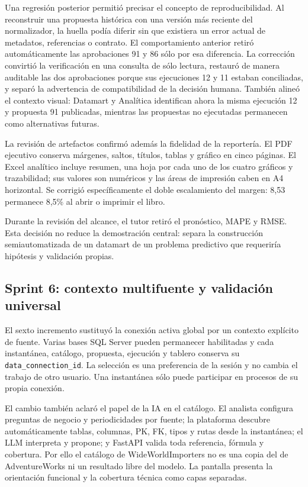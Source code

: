 \documentclass[11pt,letterpaper]{article}
\newcommand{\file}[1]{\texttt{#1}}
\begin{document}
Una regresión posterior permitió precisar el concepto de reproducibilidad. Al reconstruir una
propuesta histórica con una versión más reciente del normalizador, la huella podía diferir
sin que existiera un error actual de metadatos, referencias o contrato. El comportamiento
anterior retiró automáticamente las aprobaciones 91 y 86 sólo por esa diferencia. La
corrección convirtió la verificación en una consulta de sólo lectura, restauró de manera
auditable las dos aprobaciones porque sus ejecuciones 12 y 11 estaban conciliadas, y separó
la advertencia de compatibilidad de la decisión humana. También alineó el contexto visual:
Datamart y Analítica identifican ahora la misma ejecución 12 y propuesta 91 publicadas,
mientras las propuestas no ejecutadas permanecen como alternativas futuras.

La revisión de artefactos confirmó además la fidelidad de la reportería. El PDF ejecutivo conserva márgenes, saltos, títulos, tablas y gráfico en cinco páginas. El Excel analítico incluye resumen, una hoja por cada uno de los cuatro gráficos y trazabilidad; sus valores son numéricos y las áreas de impresión caben en A4 horizontal. Se corrigió específicamente el doble escalamiento del margen: 8,53 permanece 8,5\% al abrir o imprimir el libro.

Durante la revisión del alcance, el tutor retiró el pronóstico, MAPE y RMSE. Esta decisión no reduce la demostración central: separa la construcción semiautomatizada de un datamart de un problema predictivo que requeriría hipótesis y validación propias.

\subsection{Sprint 6: contexto multifuente y validación universal}

El sexto incremento sustituyó la conexión activa global por un contexto explícito de fuente. Varias bases SQL Server pueden permanecer habilitadas y cada instantánea, catálogo, propuesta, ejecución y tablero conserva su \file{data\_connection\_id}. La selección es una preferencia de la sesión y no cambia el trabajo de otro usuario. Una instantánea sólo puede participar en procesos de su propia conexión.

El cambio también aclaró el papel de la IA en el catálogo. El analista configura preguntas de negocio y periodicidades por fuente; la plataforma descubre automáticamente tablas, columnas, PK, FK, tipos y rutas desde la instantánea; el LLM interpreta y propone; y FastAPI valida toda referencia, fórmula y cobertura. Por ello el catálogo de WideWorldImporters no es una copia del de AdventureWorks ni un resultado libre del modelo. La pantalla presenta la orientación funcional y la cobertura técnica como capas separadas.
\end{document}
